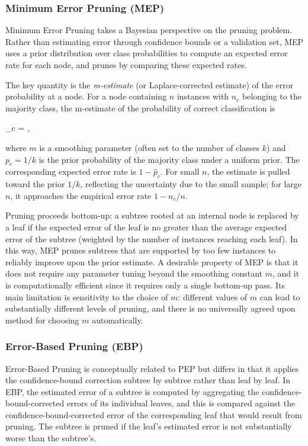 \subsubsection*{Minimum Error Pruning (MEP)}

Minimum Error Pruning takes a Bayesian perspective on the
pruning problem. Rather than estimating error through confidence bounds or a validation set,
MEP uses a prior distribution over class probabilities to compute an expected error rate for
each node, and prunes by comparing these expected rates.

The key quantity is the \emph{m-estimate} (or Laplace-corrected estimate) of the error
probability at a node. For a node containing $n$ instances with $n_c$ belonging to the
majority class, the m-estimate of the probability of correct classification is
\begin{myequation}
_c = ,
\end{myequation}
where $m$ is a smoothing parameter (often set to the number of classes $k$) and $p_c = 1/k$
is the prior probability of the majority class under a uniform prior. The corresponding
expected error rate is $1 - \hat{p}_c$. For small $n$, the estimate is pulled toward the
prior $1/k$, reflecting the uncertainty due to the small sample; for large $n$, it
approaches the empirical error rate $1 - n_c/n$.

Pruning proceeds bottom-up: a subtree rooted at an internal node is replaced by a leaf if
the expected error of the leaf is no greater than the average expected error of the subtree
(weighted by the number of instances reaching each leaf). In this way, MEP prunes subtrees
that are supported by too few instances to reliably improve upon the prior estimate. A
desirable property of MEP is that it does not require any parameter tuning beyond the
smoothing constant $m$, and it is computationally efficient since it requires only a single
bottom-up pass. Its main limitation is sensitivity to the choice of $m$: different values of
$m$ can lead to substantially different levels of pruning, and there is no universally agreed
upon method for choosing $m$ automatically.

\subsubsection*{Error-Based Pruning (EBP)}

Error-Based Pruning is conceptually related to PEP but differs in that it applies the
confidence-bound correction subtree by subtree rather than leaf by leaf. In EBP, the
estimated error of a subtree is computed by aggregating the confidence-bound-corrected
errors of its individual leaves, and this is compared against the confidence-bound-corrected
error of the corresponding leaf that would result from pruning. The subtree is pruned if the
leaf's estimated error is not substantially worse than the subtree's.

